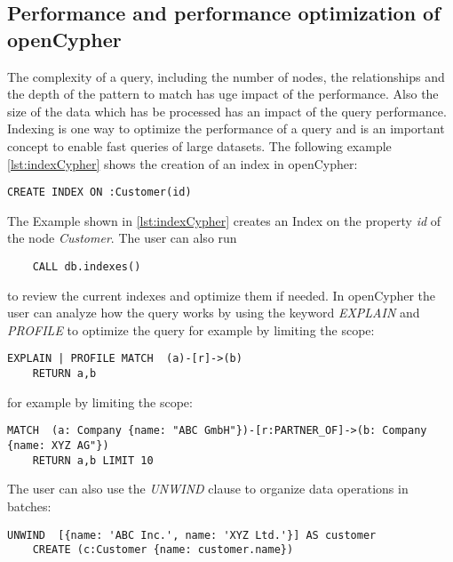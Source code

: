 \subsection{Performance and performance optimization of openCypher}
\label{subsec:different_query_languages_for_graph_databases:openCypher:performance}
The complexity of a query, including the number of nodes, the relationships and the depth of the
pattern to match has uge impact of the performance. Also the size of the data which has 
be processed has an impact of the query performance. Indexing is one way to optimize the 
performance of a query and is an important concept to enable fast queries of large 
datasets. The following example \cref{lst:indexCypher} shows the creation of an index in openCypher:
\begin{lstlisting}[caption={Index creation in openCypher}, label={lst:indexCypher}] 
	CREATE INDEX ON :Customer(id)
\end{lstlisting}
The Example shown in \cref{lst:indexCypher} creates an Index on the property \textit{id}
of the node \textit{Customer}. The user can also run 
\begin{lstlisting} 
	CALL db.indexes()
\end{lstlisting}
to review the current indexes and optimize them  if needed.
\newline
In openCypher the user can analyze how the query works by using the keyword \textit{EXPLAIN}
and \textit{PROFILE} to optimize the query for example by limiting the scope:
\begin{lstlisting}[caption={Using EXPLAIN or PROFILE in openCypher}, label={lst:explainProfileInopenCypher}] 
	EXPLAIN | PROFILE MATCH  (a)-[r]->(b)
	RETURN a,b
\end{lstlisting}
for example by limiting the scope:
\begin{lstlisting}[caption={Set a Limit in openCypher}, label={lst:limitInopenCypher}] 
	MATCH  (a: Company {name: "ABC GmbH"})-[r:PARTNER_OF]->(b: Company {name: XYZ AG"})
	RETURN a,b LIMIT 10
\end{lstlisting}
The user can also use the \textit{UNWIND} clause to organize data operations in batches:
\begin{lstlisting}[caption={Batch operations in openCypher using UNWIND}, label={lst:batchInopenCypher}] 
	UNWIND  [{name: 'ABC Inc.', name: 'XYZ Ltd.'}] AS customer
	CREATE (c:Customer {name: customer.name})
\end{lstlisting}

